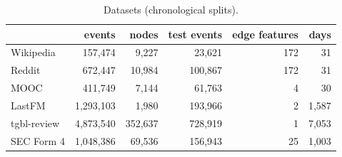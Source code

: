 \begin{table}[!htb]
\centering\scriptsize
\caption{Datasets (chronological splits).}
\label{tab:data}
\setlength{\tabcolsep}{4pt}
\begin{tabular}{@{}lrrrrr@{}}
\toprule
 & events & nodes & test events & edge features & days \\
\midrule
Wikipedia & 157,474 & 9,227 & 23,621 & 172 & 31 \\
Reddit & 672,447 & 10,984 & 100,867 & 172 & 31 \\
MOOC & 411,749 & 7,144 & 61,763 & 4 & 30 \\
LastFM & 1,293,103 & 1,980 & 193,966 & 2 & 1,587 \\
tgbl-review & 4,873,540 & 352,637 & 728,919 & 1 & 7,053 \\
SEC Form 4 & 1,048,386 & 69,536 & 156,943 & 25 & 1,003 \\
\bottomrule
\end{tabular}
\end{table}

